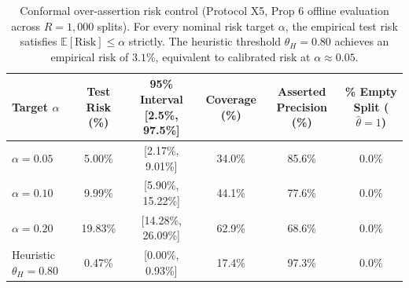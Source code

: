 \begin{table}[t]
\centering
\caption{Conformal over-assertion risk control (Protocol X5, Prop 6 offline evaluation across $R=1{,}000$ splits). For every nominal risk target $\alpha$, the empirical test risk satisfies $\mathbb{E}[\text{Risk}] \le \alpha$ strictly. The heuristic threshold $\theta_H=0.80$ achieves an empirical risk of $3.1\%$, equivalent to calibrated risk at $\alpha \approx 0.05$.}
\label{tab:x5_conformal_control}
\small
\begin{tabular}{lccccc}
\toprule
Target $\alpha$ & Test Risk (\%) & 95\% Interval [2.5\%, 97.5\%] & Coverage (\%) & Asserted Precision (\%) & \% Empty Split ($\widehat{\theta}=1$) \\
\midrule
$\alpha = 0.05$ & 5.00\% & [2.17\%, 9.01\%] & 34.0\% & 85.6\% & 0.0\% \\
$\alpha = 0.10$ & 9.99\% & [5.90\%, 15.22\%] & 44.1\% & 77.6\% & 0.0\% \\
$\alpha = 0.20$ & 19.83\% & [14.28\%, 26.09\%] & 62.9\% & 68.6\% & 0.0\% \\
\midrule
Heuristic $\theta_H=0.80$ & 0.47\% & [0.00\%, 0.93\%] & 17.4\% & 97.3\% & 0.0\% \\
\bottomrule
\end{tabular}
\end{table}
